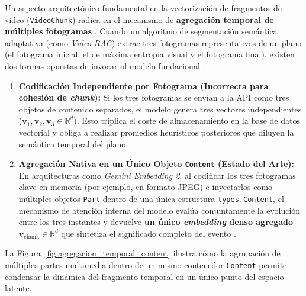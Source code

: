 Un aspecto arquitectónico fundamental en la vectorización de fragmentos de vídeo (\texttt{VideoChunk}) radica en el mecanismo de \textbf{agregación temporal de múltiples fotogramas} \cite{gemini_emb2_docs}. Cuando un algoritmo de segmentación semántica adaptativa (como \textit{Video-RAC}) extrae tres fotogramas representativos de un plano (el fotograma inicial, el de máxima entropía visual y el fotograma final), existen dos formas opuestas de invocar al modelo fundacional \cite{video_rac2025, gemini_emb2_docs}:
\begin{enumerate}
    \item \textbf{Codificación Independiente por Fotograma (Incorrecta para cohesión de \textit{chunk}):} Si los tres fotogramas se envían a la API como tres objetos de contenido separados, el modelo genera tres vectores independientes ($\mathbf{v}_1, \mathbf{v}_2, \mathbf{v}_3 \in \mathbb{R}^d$). Esto triplica el coste de almacenamiento en la base de datos vectorial y obliga a realizar promedios heurísticos posteriores que diluyen la semántica temporal del plano.
    \item \textbf{Agregación Nativa en un Único Objeto \texttt{Content} (Estado del Arte):} En arquitecturas como \textit{Gemini Embedding 2}, al codificar los tres fotogramas clave en memoria (por ejemplo, en formato JPEG) e inyectarlos como múltiples objetos \texttt{Part} dentro de una única estructura \texttt{types.Content}, el mecanismo de atención interna del modelo evalúa conjuntamente la evolución entre los tres instantes y devuelve \textbf{un único \textit{embedding} denso agregado} $\mathbf{v}_{\text{chunk}} \in \mathbb{R}^d$ que sintetiza el significado completo del evento \cite{gemini_emb2_docs}.
\end{enumerate}

La Figura~\ref{fig:agregacion_temporal_content} ilustra cómo la agrupación de múltiples partes multimedia dentro de un mismo contenedor \texttt{Content} permite condensar la dinámica del fragmento temporal en un único punto del espacio latente.

